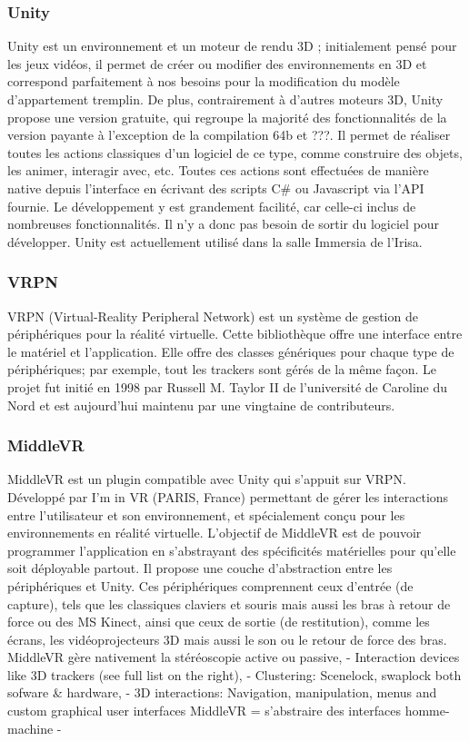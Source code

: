 	\subsubsection{Unity} 
		Unity est un environnement et un moteur de rendu 3D ; initialement pensé pour les jeux vidéos, il permet de créer ou modifier des environnements en 3D et correspond parfaitement à nos besoins pour la modification du modèle d’appartement tremplin.
		De plus, contrairement à d’autres moteurs 3D, Unity propose une version gratuite, qui regroupe la majorité des fonctionnalités de la version payante à l'exception de la compilation 64b et ???.
		Il permet de réaliser toutes les actions classiques d'un logiciel de ce type, comme construire des objets, les animer, interagir avec, etc. Toutes ces actions sont effectuées de manière native depuis l'interface en écrivant des scripts C\# ou Javascript via l'API fournie.
		Le développement y est grandement facilité, car celle-ci inclus de nombreuses fonctionnalités.
		Il n'y a donc pas besoin de sortir du logiciel pour développer.
		Unity est actuellement utilisé dans la salle Immersia de l’Irisa.      

	\subsubsection{VRPN}
		VRPN (Virtual-Reality Peripheral Network) est un système de gestion de périphériques pour la réalité virtuelle. Cette bibliothèque offre une interface entre le matériel et l'application. Elle offre des classes génériques pour chaque type de périphériques; par exemple, tout les trackers sont gérés de la même façon.
		Le projet fut initié en 1998 par Russell M. Taylor II de l'université de Caroline du Nord et est aujourd'hui maintenu par une vingtaine de contributeurs.
	
	\subsubsection{MiddleVR}
		MiddleVR est un plugin compatible avec Unity qui s'appuit sur  VRPN. Développé par I’m in VR (PARIS, France) permettant de gérer les interactions entre l’utilisateur et son environnement, et spécialement conçu pour les environnements en réalité virtuelle. 
		L'objectif de MiddleVR est de pouvoir programmer l'application en s'abstrayant des spécificités matérielles pour qu'elle soit déployable partout.
		Il propose une couche d’abstraction entre les périphériques et Unity. Ces périphériques comprennent ceux d’entrée (de capture), tels que les classiques claviers et souris mais aussi les bras à retour de force ou des MS Kinect, ainsi que ceux de sortie (de restitution), comme les écrans, les vidéoprojecteurs 3D mais aussi le son ou le retour de force des bras. 
		MiddleVR gère nativement la stéréoscopie active ou passive,
		- Interaction devices like 3D trackers (see full list on the right),
		- Clustering: Scenelock, swaplock both sofware \& hardware,
		- 3D interactions: Navigation, manipulation, menus and custom graphical user interfaces
		MiddleVR = s'abstraire des interfaces homme-machine - 

